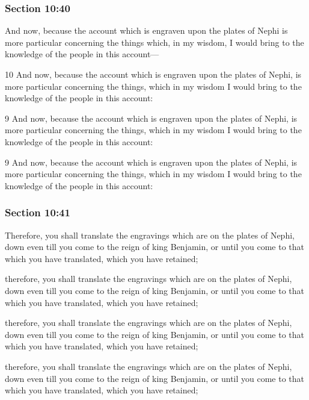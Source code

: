 	\subsubsection{Section 10:40} %
		\label{DC10-40}

		And now, because the account which is engraven upon the plates of Nephi is more particular concerning the things which, in my wisdom, I would bring to the knowledge of the people in this account---

		\begin{framed}
		\scriptsize
			\begin{compactdesc}
				\item[JSP] 10 And now, because the account which is engraven upon the plates of Nephi, is more particular concerning the things, which in my wisdom I would bring to the knowledge of the people in this account:
				\item[RB1] [\textit{missing}] 
				\item[DC 1835] 9 And now, because the account which is engraven upon the plates of Nephi, is more particular concerning the things, which in my wisdom I would bring to the knowledge of the people in this account:
				\item[DC 1844] 9 And now, because the account which is engraven upon the plates of Nephi, is more particular concerning the things, which in my wisdom I would bring to the knowledge of the people in this account: 
			\end{compactdesc}
		\end{framed}

	\subsubsection{Section 10:41} %
		\label{DC10-41}

		Therefore, you shall translate the engravings which are on the plates of Nephi, down even till you come to the reign of king Benjamin, or until you come to that which you have translated, which you have retained;

		\begin{framed}
		\scriptsize
			\begin{compactdesc}
				\item[JSP] therefore, you shall translate the engravings which are on the plates of Nephi, down even till you come to the reign of king Benjamin, or until you come to that which you have translated, which you have retained;
				\item[RB1] [\textit{missing}]
				\item[DC 1835] therefore, you shall translate the engravings which are on the plates of Nephi, down even till you come to the reign of king Benjamin, or until you come to that which you have translated, which you have retained;
				\item[DC 1844] therefore, you shall translate the engravings which are on the plates of Nephi, down even till you come to the reign of king Benjamin, or until you come to that which you have translated, which you have retained; 
			\end{compactdesc}
		\end{framed}

